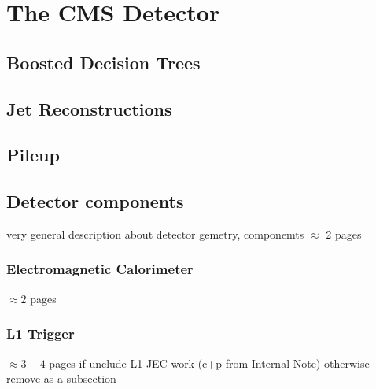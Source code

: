 \chapter{The CMS Detector}
\label{detector}
\section{Boosted Decision Trees}
\label{sec:boosteddecisiontrees}
\section{Jet Reconstructions}
\label{sec:jetreconstructions}
\section{Pileup }
\label{sec:pileup}

\section{Detector components}
very general description about detector gemetry, componemts
$\approx$ 2 pages
\subsection{Electromagnetic Calorimeter}
$\approx 2$ pages
\subsection{L1 Trigger}
$\approx 3-4$ pages if unclude L1 JEC work (c+p from Internal Note) 
otherwise remove as a subsection


